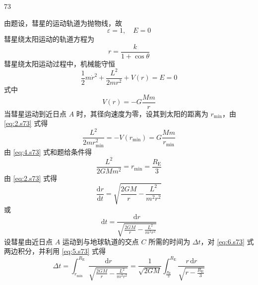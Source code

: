 \begin{solution}{73}
    \begin{subsolution}
        由题设，彗星的运动轨道为抛物线，故
        \begin{equation}
            \varepsilon = 1,\quad E = 0
        \end{equation}
        彗星绕太阳运动的轨道方程为
        \begin{equation}
            r = \frac{k}{1 + \cos \theta}
            \label{eq:1.s73}
        \end{equation}
        彗星绕太阳运动过程中，机械能守恒
        \begin{equation}
            \frac{1}{2} m \dot{r}^{2} + \frac{L^{2}}{2 m r^{2}} + V(r) = E = 0
            \label{eq:2.s73}
        \end{equation}
        式中
        \begin{equation}
            V(r) = - G \frac{M m}{r}
            \label{eq:3.s73}
        \end{equation}
        当彗星运动到近日点 $A$ 时，其径向速度为零，设其到太阳的距离为 $r_{\min}$，由 \eqref{eq:2.s73} 式得
        \begin{equation}
            \frac{L^{2}}{2 m r_{\min}^{2}} = - V(r_{\min}) = G \frac{M m}{r_{\min}}
            \label{eq:4.s73}
        \end{equation}
        由 \eqref{eq:4.s73} 式和题给条件得
        \begin{equation}
            \frac{L^{2}}{2 G M m^{2}} = r_{\min} = \frac{R_{\mathrm{E}}}{3}
            \label{eq:5.s73}
        \end{equation}
        由 \eqref{eq:2.s73} 式得
        \begin{equation}
            \frac{\mathrm{d} r}{\mathrm{d} t} = \sqrt{\frac{2 G M}{r} - \frac{L^{2}}{m^{2} r^{2}}}
        \end{equation}
        或
        \begin{equation}
            \mathrm{d} t = \frac{\mathrm{d} r}{\sqrt{\frac{2 G M}{r} - \frac{L^{2}}{m^{2} r^{2}}}}
            \label{eq:6.s73}
        \end{equation}
        设彗星由近日点 $A$ 运动到与地球轨道的交点 $C$ 所需的时间为 $\Delta t$，对 \eqref{eq:6.s73} 式两边积分，并利用 \eqref{eq:5.s73} 式得
        \begin{equation}
            \Delta t = \int_{r_{\min}}^{R_{\mathrm{E}}} \frac{\mathrm{d} r}{\sqrt{\frac{2 G M}{r} - \frac{L^{2}}{m^{2} r^{2}}}} = \frac{1}{\sqrt{2 G M}} \int_{\frac{R_{\mathrm{E}}}{3}}^{R_{\mathrm{E}}} \frac{r \,\mathrm{d} r}{\sqrt{r - \frac{R_{\mathrm{E}}}{3}}}

\end{equation}
\end{subsolution}
\end{solution}
